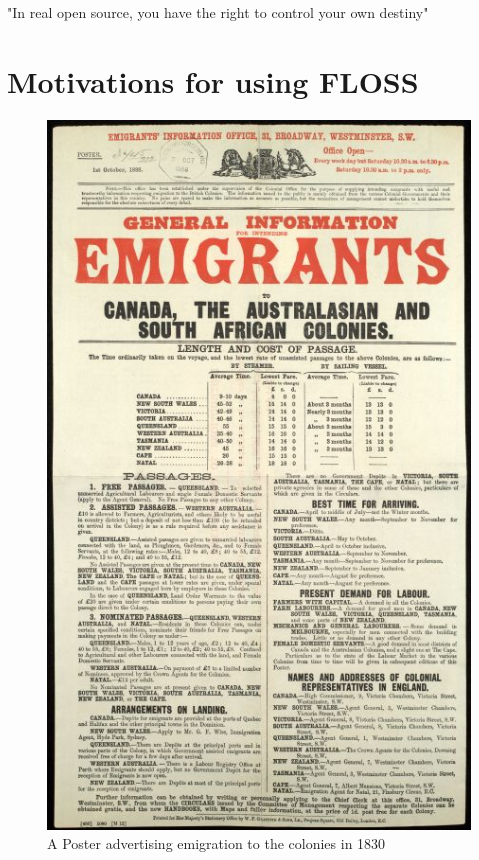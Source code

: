 \newpage
\begin{savequote}[108mm]
"In real open source, you have the right to control your own destiny"
\end{savequote}
\chapter{Motivations for using FLOSS}
\label{chap:Motivations}
\vspace{-2cm}

    \begin{figure}

     \includegraphics[scale=1.8]{img/Canadaemigration.png}
   \caption  [A Poster advertising emigration to the colonies in 1830]{ {A Poster advertising emigration to the colonies in 1830 \protect\footnotemark} } 
   \end{figure} 
 
